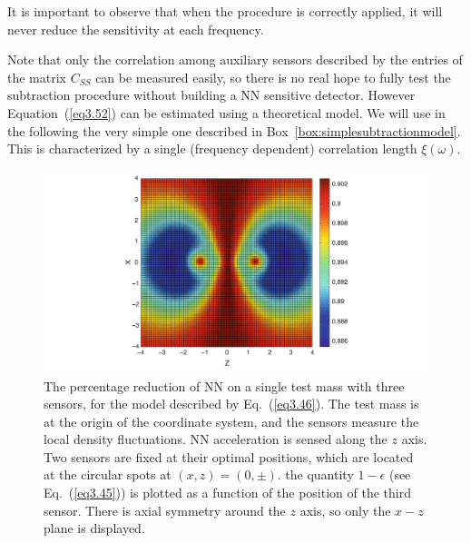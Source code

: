 It is important to observe that when the procedure is correctly applied, it
will never reduce the sensitivity at each frequency.

Note that only the correlation among auxiliary sensors described by the
entries of the matrix $C_{SS}$ can be measured easily, so there is no real
hope to fully test the subtraction procedure without building a NN sensitive
detector. However Equation~(\ref{eq3.52}) can be estimated using a theoretical
model. We will use in the following the very simple one described in
Box~\ref{box:simplesubtractionmodel}. This is characterized by a single
(frequency dependent) correlation length $\xi(\omega)$.

\begin{figure}[t]
	\begin{center}
		\includegraphics[width=16.5cm]{./Sec_SiteInfra/Figures/SimplOptSens.pdf}
		\end{center}
		\caption{The percentage reduction of NN on a single test mass with three sensors, for the model described by Eq.~(\ref{eq3.46}). The test mass is at the origin of the coordinate system, and the sensors measure the local density fluctuations. NN acceleration is sensed along the $z$ axis. Two sensors are fixed at their optimal positions, which are located at the circular spots at $(x,z)=(0,\pm)$. the quantity $1-\epsilon$ (see Eq.~(\ref{eq3.45})) is plotted as a function of the position of the third sensor. There is axial symmetry around the $z$ axis, so only the $x-z$ plane is displayed.}
\label{fig:NNreduction}
\end{figure}

